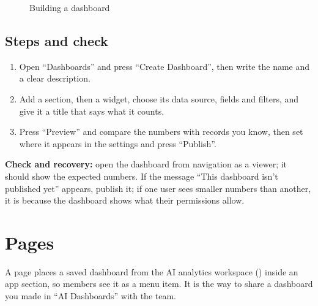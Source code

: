 \begin{figure}[H]
\centering
{}
\rclegend
\caption{Building a dashboard}
\label{fig:builder-dashboards-flow}
\end{figure}

\subsection{Steps and check}
\begin{enumerate}
\item Open “Dashboards” and press “Create Dashboard”, then write the name and a clear description.
\item Add a section, then a widget, choose its data source, fields and filters, and give it a title that says what it counts.
\item Press “Preview” and compare the numbers with records you know, then set where it appears in the settings and press “Publish”.
\end{enumerate}

\textbf{Check and recovery:} open the dashboard from navigation as a viewer; it should show the expected numbers. If the message “This dashboard isn't published yet” appears, publish it; if one user sees smaller numbers than another, it is because the dashboard shows what their permissions allow.

\clearpage
\section{Pages}
\label{sec:builder-feature-pages}

A page places a saved dashboard from the AI analytics workspace () inside an app section, so members see it as a menu item. It is the way to share a dashboard you made in “AI Dashboards” with the team.

